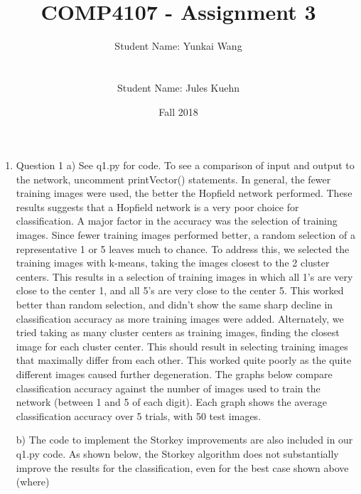 \documentclass[11pt]{article}
\title{COMP4107 - Assignment 3}
\author{Student Name: Yunkai Wang\\
\text{Student Number: 100968473}\\\\
Student Name: Jules Kuehn\\
\text{Student Number: 100661464}}
\date{Fall 2018}
\begin{document}
\maketitle
\begin{enumerate}

\item Question 1
a) See q1.py for code. To see a comparison of input and output to the network, uncomment printVector() statements.\newline
\newline
In general, the fewer training images were used, the better the Hopfield network performed. These results suggests that a Hopfield network is a very poor choice for classification.\newline
A major factor in the accuracy was the selection of training images. Since fewer training images performed better, a random selection of a representative 1 or 5 leaves much to chance. To address this, we selected the training images with k-means, taking the images closest to the 2 cluster centers. This results in a selection of training images in which all 1's are very close to the center 1, and all 5's are very close to the center 5. This worked better than random selection, and didn't show the same sharp decline in classification accuracy as more training images were added.\newline
Alternately, we tried taking as many cluster centers as training images, finding the closest image for each cluster center. This should result in selecting training images that maximally differ from each other. This worked quite poorly as the quite different images caused further degeneration.\newline
The graphs below compare classification accuracy against the number of images used to train the network (between 1 and 5 of each digit). Each graph shows the average classification accuracy over 5 trials, with 50 test images.
% 

b) The code to implement the Storkey improvements are also included in our q1.py code.\newline
\newline
As shown below, the Storkey algorithm does not substantially improve the results for the classification, even for the best case shown above (where)
% 


\end{enumerate}
\end{document}

